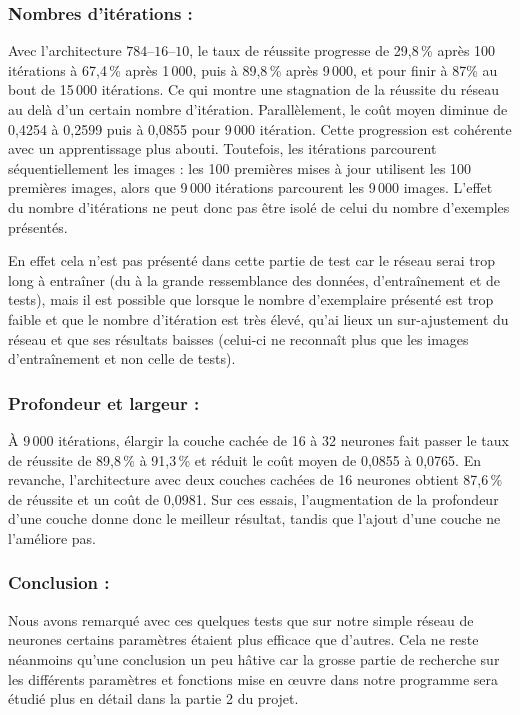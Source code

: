 \documentclass[12pt,a4paper]{article}
\begin{document}
\subsubsection{Nombres d'itérations :}

Avec l’architecture $784$--$16$--$10$, le taux de réussite progresse de 29{,}8\,\% après 100 itérations à 67{,}4\,\% après 1\,000, puis à 89{,}8\,\% après 9\,000, et pour finir à 87\% au bout de 15\,000 itérations. Ce qui montre une stagnation de la réussite du réseau au delà d'un certain nombre d'itération. Parallèlement, le coût moyen diminue de 0{,}4254 à 0{,}2599 puis à 0{,}0855 pour 9\,000 itération. Cette progression est cohérente avec un apprentissage plus abouti. Toutefois, les itérations parcourent séquentiellement les images : les 100 premières mises à jour utilisent les 100 premières images, alors que 9\,000 itérations parcourent les 9\,000 images. L’effet du nombre d’itérations ne peut donc pas être isolé de celui du nombre d’exemples présentés.

En effet cela n'est pas présenté dans cette partie de test car le réseau serai trop long à entraîner (du à la grande ressemblance des données, d'entraînement et de tests), mais il est possible que lorsque le nombre d'exemplaire présenté est trop faible et que le nombre d'itération est très élevé, qu'ai lieux un sur-ajustement du réseau et que ses résultats baisses (celui-ci ne reconnaît plus que les images d'entraînement et non celle de tests).

\subsubsection{Profondeur et largeur :}

À 9\,000 itérations, élargir la couche cachée de 16 à 32 neurones fait passer le taux de réussite de 89{,}8\,\% à 91{,}3\,\% et réduit le coût moyen de 0{,}0855 à 0{,}0765. En revanche, l’architecture avec deux couches cachées de 16 neurones obtient 87{,}6\,\% de réussite et un coût de 0{,}0981. Sur ces essais, l’augmentation de la profondeur d'une couche donne donc le meilleur résultat, tandis que l’ajout d’une couche ne l’améliore pas.

\subsubsection{Conclusion :}

Nous avons remarqué avec ces quelques tests que sur notre simple réseau de neurones certains paramètres étaient plus efficace que d'autres. Cela ne reste néanmoins qu'une conclusion un peu hâtive car la grosse partie de recherche sur les différents paramètres et fonctions mise en œuvre dans notre programme sera étudié plus en détail dans la partie 2 du projet. 
\end{document}

